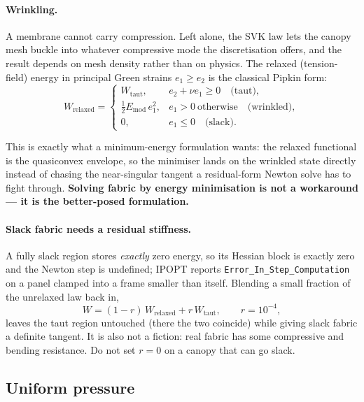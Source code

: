 \documentclass[11pt,a4paper]{article}
\newcommand{\code}[1]{\texttt{\small #1}}
\begin{document}
\paragraph{Wrinkling.} A membrane cannot carry compression. Left alone, the SVK
law lets the canopy mesh buckle into whatever compressive mode the
discretisation offers, and the result depends on mesh density rather than on
physics. The relaxed (tension-field) energy in principal Green strains
$e_1 \ge e_2$ is the classical Pipkin form:
\begin{equation}
  W_{\text{relaxed}} =
  \begin{cases}
    W_{\text{taut}}, & e_2 + \nu e_1 \ge 0 \quad\text{(taut)},\\[2pt]
    \tfrac{1}{2}E_{\text{mod}}\,e_1^2, & e_1 > 0 \ \text{otherwise}\quad\text{(wrinkled)},\\[2pt]
    0, & e_1 \le 0 \quad\text{(slack)}.
  \end{cases}
\end{equation}

This is exactly what a minimum-energy formulation wants: the relaxed functional
is the quasiconvex envelope, so the minimiser lands on the wrinkled state
directly instead of chasing the near-singular tangent a residual-form Newton
solve has to fight through. \textbf{Solving fabric by energy minimisation is not
a workaround --- it is the better-posed formulation.}

\paragraph{Slack fabric needs a residual stiffness.} A fully slack region stores
\emph{exactly} zero energy, so its Hessian block is exactly zero and the Newton
step is undefined; IPOPT reports \code{Error\_In\_Step\_Computation} on a panel
clamped into a frame smaller than itself. Blending a small fraction of the
unrelaxed law back in,
\begin{equation}
  W = (1-r)\,W_{\text{relaxed}} + r\,W_{\text{taut}}, \qquad r = 10^{-4},
\end{equation}
leaves the taut region untouched (there the two coincide) while giving slack
fabric a definite tangent. It is also not a fiction: real fabric has some
compressive and bending resistance. Do not set $r=0$ on a canopy that can go
slack.

\subsection{Uniform pressure}
\end{document}
